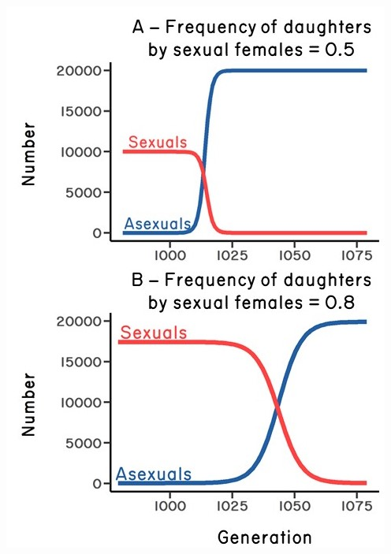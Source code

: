\documentclass[
  letterpaper,
]{book}
\begin{document}
\hypertarget{fig-1-2}{}
{
\makeatletter
\def\LT@makecaption#1#2#3{%
  \noalign{\smash{\hbox{\kern\textwidth\rlap{\kern\marginparsep
  \parbox[t]{\marginparwidth}{%
    \footnotesize{%
      \vspace{(1.1\baselineskip)}
    #1{#2: }\ignorespaces #3}}}}}}%
    }
\makeatother

{\includegraphics{images/fig1-2.jpg}}

}
\end{document}
